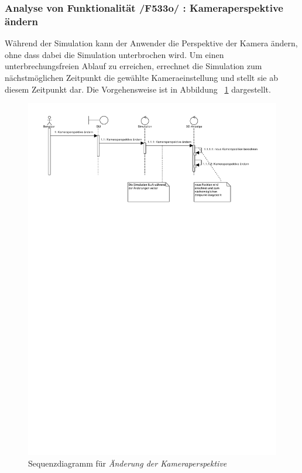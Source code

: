 \subsubsection{Analyse von Funktionalität /F533o/ :  Kameraperspektive ändern}
Während der Simulation kann der Anwender die Perspektive der Kamera ändern, ohne dass dabei die Simulation unterbrochen wird. Um einen unterbrechungsfreien Ablauf zu erreichen, errechnet die Simulation zum nächstmöglichen Zeitpunkt die gewählte Kameraeinstellung und stellt sie ab diesem Zeitpunkt dar. Die Vorgehensweise ist in Abbildung ~\ref{fig:Kameraperspektive} dargestellt.
\begin{figure}[h!]
\includegraphics[viewport = 0 17.5cm 25cm 30cm,width=\linewidth]{bilder/Kameraperspektive.pdf}
\caption{Sequenzdiagramm für \textit{Änderung der Kameraperspektive}}
\label{fig:Kameraperspektive}
\end{figure}
